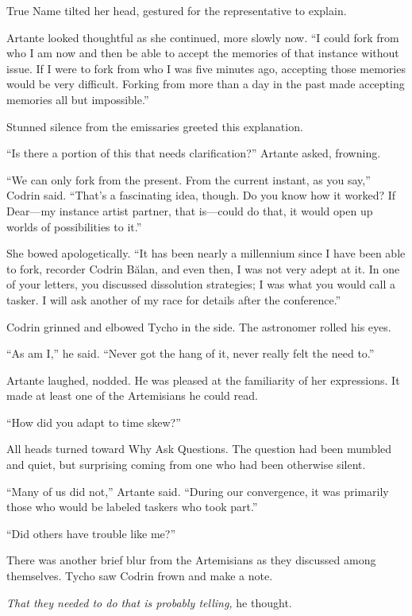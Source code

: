 True Name tilted her head, gestured for the representative to explain.

Artante looked thoughtful as she continued, more slowly now. ``I could fork from who I am now and then be able to accept the memories of that instance without issue. If I were to fork from who I was five minutes ago, accepting those memories would be very difficult. Forking from more than a day in the past made accepting memories all but impossible.''

Stunned silence from the emissaries greeted this explanation.

``Is there a portion of this that needs clarification?'' Artante asked, frowning.

``We can only fork from the present. From the current instant, as you say,'' Codrin said. ``That's a fascinating idea, though. Do you know how it worked? If Dear—my instance artist partner, that is—could do that, it would open up worlds of possibilities to it.''

She bowed apologetically. ``It has been nearly a millennium since I have been able to fork, recorder Codrin Bălan, and even then, I was not very adept at it. In one of your letters, you discussed dissolution strategies; I was what you would call a tasker. I will ask another of my race for details after the conference.''

Codrin grinned and elbowed Tycho in the side. The astronomer rolled his eyes.

``As am I,'' he said. ``Never got the hang of it, never really felt the need to.''

Artante laughed, nodded. He was pleased at the familiarity of her expressions. It made at least one of the Artemisians he could read.

``How did you adapt to time skew?''

All heads turned toward Why Ask Questions. The question had been mumbled and quiet, but surprising coming from one who had been otherwise silent.

``Many of us did not,'' Artante said. ``During our convergence, it was primarily those who would be labeled taskers who took part.''

``Did others have trouble like me?''

There was another brief blur from the Artemisians as they discussed among themselves. Tycho saw Codrin frown and make a note.

\emph{That they needed to do that is probably telling,} he thought.

